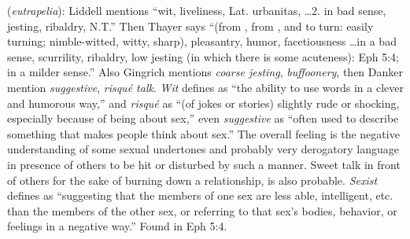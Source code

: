 \item[Sex-slander,]

(\textit{eutrapelia}):
Liddell mentions ``wit, liveliness, Lat. urbanitas, \ldots 2. in bad sense, jesting, ribaldry, N.T.'' Then Thayer says ``(from , from , and  to turn: easily turning; nimble-witted, witty, sharp), pleasantry, humor, facetiousness \ldots in a bad sense, scurrility, ribaldry, low jesting (in which there is some acuteness): Eph 5:4; in a milder sense.'' Also Gingrich mentions \emph{coarse jesting}, \emph{buffoonery}, then Danker mention \emph{suggestive}, \emph{risqué talk}. \emph{Wit} defines as ``the ability to use words in a clever and humorous way,'' and \emph{risqué} as ``(of jokes or stories) slightly rude or shocking, especially because of being about sex,'' even \emph{suggestive} as ``often used to describe something that makes people think about sex.'' The overall feeling is the negative understanding of some sexual undertones and probably very derogatory language in presence of others to be hit or disturbed by such a manner. Sweet talk in front of others for the sake of burning down a relationship, is also probable. \emph{Sexist} defines as ``suggesting that the members of one sex are less able, intelligent, etc. than the members of the other sex, or referring to that sex's bodies, behavior, or feelings in a negative way.''
Found in Eph 5:4.
